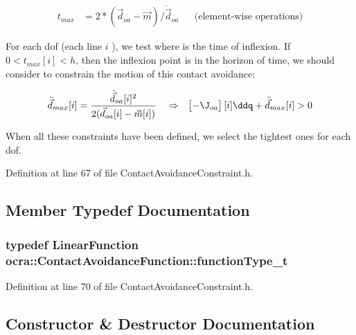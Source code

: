 \begin{align*} t_{max} &= 2*(\vec{d}_{oa} - \vec{m}) / \dot{\vec{d}}_{oa} & & \text{(element-wise operations)} \end{align*}

For each dof (each line $ i $ ), we test where is the time of inflexion. If $ 0 < t_{max}[i] < h$, then the inflexion point is in the horizon of time, we should consider to constrain the motion of this contact avoidance\+:

\begin{align*} \ddot{\vec{d}}_{max}[i] &= \frac{ \dot{\vec{d}}_{oa}[i]^2 }{ 2( \vec{d}_{oa}[i] - \vec{m}[i] ) } & & \Rightarrow & \begin{bmatrix} - \J_{oa} \end{bmatrix} [i] \ddq + \ddot{\vec{d}}_{max}[i] > 0 \end{align*}

When all these constraints have been defined, we select the tightest ones for each dof. 

Definition at line 67 of file Contact\+Avoidance\+Constraint.\+h.



\subsection{Member Typedef Documentation}
\subsubsection[{\texorpdfstring{function\+Type\+\_\+t}{functionType_t}}]{\setlength{\rightskip}{0pt plus 5cm}typedef {\bf Linear\+Function} {\bf ocra\+::\+Contact\+Avoidance\+Function\+::function\+Type\+\_\+t}}\hypertarget{classocra_1_1ContactAvoidanceFunction_a15d14e0a9e8810d1a6990d5ab7e179ab}{}\label{classocra_1_1ContactAvoidanceFunction_a15d14e0a9e8810d1a6990d5ab7e179ab}


Definition at line 70 of file Contact\+Avoidance\+Constraint.\+h.



\subsection{Constructor \& Destructor Documentation}
